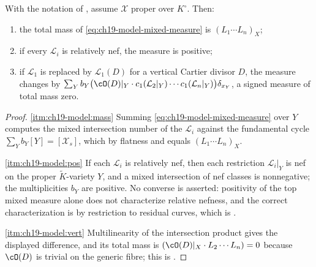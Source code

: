 \begin{proposition}
\label{prop:ch19-model-basic}
With the notation of , assume
$\mathcal X$ proper over $K^\circ$.  Then:
\begin{enumerate}
\item\label{itm:ch19-model:mass} the total mass of
 \eqref{eq:ch19-model-mixed-measure} is $(L_1\cdots L_n)_X$;
\item\label{itm:ch19-model:pos} if every $\mathcal L_i$ is relatively nef,
 the measure is positive;
\item\label{itm:ch19-model:vert} if $\mathcal L_1$ is replaced by
 $\mathcal L_1(D)$ for a vertical Cartier divisor $D$, the measure
 changes by
 $\sum_Yb_Y\bigl(\cO(D)|_Y\cdot c_1(\mathcal L_2|_Y)\cdots
   c_1(\mathcal L_n|_Y)\bigr)\delta_{x_Y}$, a signed measure of total mass
 zero.
\end{enumerate}
\end{proposition}

\begin{proof}
\cref{itm:ch19-model:mass} Summing \eqref{eq:ch19-model-mixed-measure} over
$Y$ computes the mixed intersection number of the $\mathcal L_i$ against the
fundamental cycle $\sum_Yb_Y[Y]=[\mathcal X_s]$, which by flatness and
 equals $(L_1\cdots L_n)_X$.

\cref{itm:ch19-model:pos} If each $\mathcal L_i$ is relatively nef, then each
restriction $\mathcal L_i|_Y$ is nef on the proper $\widetilde K$-variety
$Y$, and a mixed intersection of nef classes is nonnegative; the
multiplicities $b_Y$ are positive.  No converse is asserted: positivity of
the top mixed measure alone does not characterize relative nefness, and the
correct characterization is by restriction to residual curves, which is
.

\cref{itm:ch19-model:vert} Multilinearity of the intersection product gives
the displayed difference, and its total mass is
$(\cO(D)|_X\cdot L_2\cdots L_n)=0$ because $\cO(D)$ is trivial on the generic
fibre; this is .
\end{proof}

